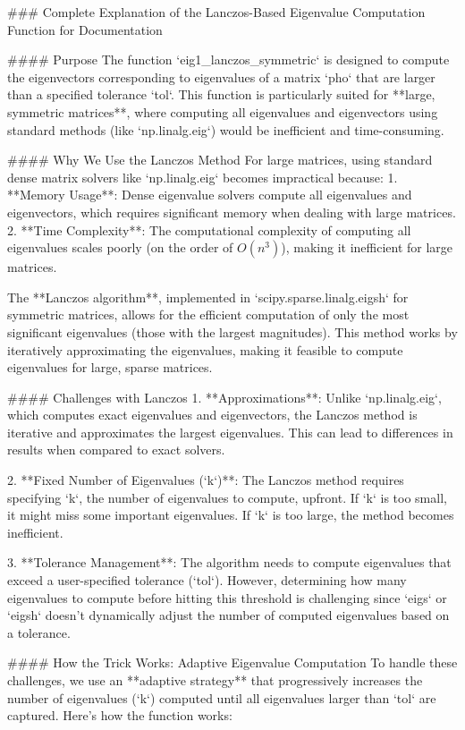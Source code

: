 ### Complete Explanation of the Lanczos-Based Eigenvalue Computation Function for Documentation

#### Purpose
The function `eig1_lanczos_symmetric` is designed to compute the eigenvectors corresponding to eigenvalues of a matrix `pho` that are larger than a specified tolerance `tol`. This function is particularly suited for **large, symmetric matrices**, where computing all eigenvalues and eigenvectors using standard methods (like `np.linalg.eig`) would be inefficient and time-consuming.

#### Why We Use the Lanczos Method
For large matrices, using standard dense matrix solvers like `np.linalg.eig` becomes impractical because:
1. **Memory Usage**: Dense eigenvalue solvers compute all eigenvalues and eigenvectors, which requires significant memory when dealing with large matrices.
2. **Time Complexity**: The computational complexity of computing all eigenvalues scales poorly (on the order of \(O(n^3)\)), making it inefficient for large matrices.

The **Lanczos algorithm**, implemented in `scipy.sparse.linalg.eigsh` for symmetric matrices, allows for the efficient computation of only the most significant eigenvalues (those with the largest magnitudes). This method works by iteratively approximating the eigenvalues, making it feasible to compute eigenvalues for large, sparse matrices.

#### Challenges with Lanczos
1. **Approximations**: Unlike `np.linalg.eig`, which computes exact eigenvalues and eigenvectors, the Lanczos method is iterative and approximates the largest eigenvalues. This can lead to differences in results when compared to exact solvers.
   
2. **Fixed Number of Eigenvalues (`k`)**: The Lanczos method requires specifying `k`, the number of eigenvalues to compute, upfront. If `k` is too small, it might miss some important eigenvalues. If `k` is too large, the method becomes inefficient.

3. **Tolerance Management**: The algorithm needs to compute eigenvalues that exceed a user-specified tolerance (`tol`). However, determining how many eigenvalues to compute before hitting this threshold is challenging since `eigs` or `eigsh` doesn’t dynamically adjust the number of computed eigenvalues based on a tolerance.

#### How the Trick Works: Adaptive Eigenvalue Computation
To handle these challenges, we use an **adaptive strategy** that progressively increases the number of eigenvalues (`k`) computed until all eigenvalues larger than `tol` are captured. Here’s how the function works:

